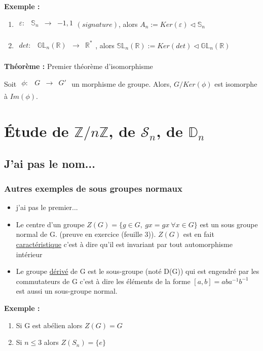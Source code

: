 \documentclass{report}
\newenvironment{exemple}{\begin{tcolorbox}[colback=gray!10,colframe= white]
    \textbf{Exemple :}
     \par}
    {\end{tcolorbox}}
\newenvironment{theoreme}[1][]{
    \begin{tcolorbox}[]
    \textbf{Théorème :} #1  \par} 
    {\end{tcolorbox}}
\newcommand{\fctsarg}[3]{
    \begin{array}{lrcl}
    #1: & #2 & \longrightarrow & #3 \\
    \end{array}
}
\newcommand{\Z}{\mathbb{Z}}
\newcommand{\R}{\mathbb{R}}
\newcommand{\znz}{\Z/n\Z}
\newcommand{\sn}{\mathcal{S}_{n}}
\newcommand{\dsp}{\displaystyle}
\begin{document}
\begin{exemple}
    \begin{enumerate}
        \item $\fctsarg{\varepsilon}{\mathbb{S}_n}{-1,1} (signature)$, alors $A_n := Ker(\varepsilon) \triangleleft \mathbb{S}_n$
        \item $\fctsarg{det}{\mathbb{GL}_n(\R)}{\R^*}$, alors $\mathbb{SL}_n(\R) := Ker(det) \triangleleft \mathbb{GL}_n(\R)$
    \end{enumerate}
\end{exemple}

\begin{theoreme}[Premier théorème d'isomorphisme]
    Soit $\fctsarg{\phi}{G}{G'}$ un morphisme de groupe. Alors, $G/Ker(\phi)$ est isomorphe à $Im(\phi)$.
\end{theoreme}

\chapter{\texorpdfstring{Étude de $\znz$, de $\sn$, de $\mathbb{D}_{n}$}{Etude de Z/nZ, Sn, Dn}}

\section{J'ai pas le nom...}




\subsection{Autres exemples de sous groupes normaux}

\begin{itemize}
\item j'ai pas le premier...
\item Le centre d'un groupe $\dsp Z(G)=\{g\in G,~gx=gx~\forall x\in G\}$ est un sous groupe normal de G. (preuve en exercice (feuille 3)). $Z(G)$ est en fait \underline{caractéristique} c'est à dire qu'il est invariant par tout automorphisme intérieur
\item Le groupe \underline{dérivé} de G est le sous-groupe (noté D(G)) qui est engendré par les commutateurs de G c'est à dire les éléments de la forme $[a,b]=aba^{-1}b^{-1}$ est aussi un sous-groupe normal.
\end{itemize}

\begin{exemple}
    \begin{enumerate}
        \item Si G est abélien alors $Z(G)=G$
        \item Si $n\leq3$ alors $Z(S_{n})=\{e\}$
    \end{enumerate}
\end{exemple}
\end{document}
